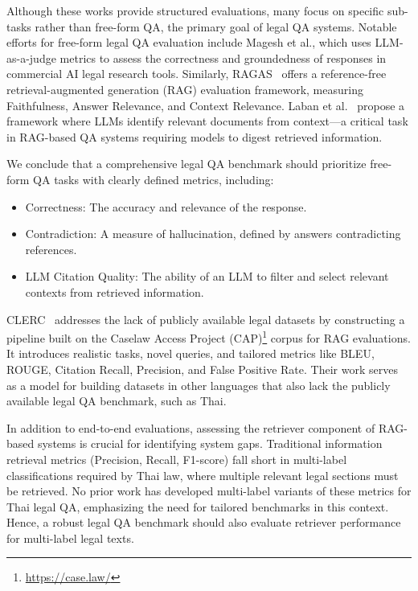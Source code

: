 Although these works provide structured evaluations, many focus on specific sub-tasks rather than free-form QA, the primary goal of legal QA systems. 
%
Notable efforts for free-form legal QA evaluation include Magesh et al.\cite{magesh2024hallucinationfreeassessingreliabilityleading}, which uses LLM-as-a-judge metrics to assess the correctness and groundedness of responses in commercial AI legal research tools. 
%
Similarly, RAGAS~\cite{es2023ragasautomatedevaluationretrieval} offers a reference-free retrieval-augmented generation (RAG) evaluation framework, measuring Faithfulness, Answer Relevance, and Context Relevance. 
%
Laban et al.~\cite{laban2024summaryhaystackchallengelongcontext} propose a framework where LLMs identify relevant documents from context—a critical task in RAG-based QA systems requiring models to digest retrieved information.

We conclude that a comprehensive legal QA benchmark should prioritize free-form QA tasks with clearly defined metrics, including:

\begin{itemize}
    \item{Correctness: The accuracy and relevance of the response.}
    \item{Contradiction: A measure of hallucination, defined by answers contradicting references.}
    \item{LLM Citation Quality: The ability of an LLM to filter and select relevant contexts from retrieved information.}
\end{itemize}

CLERC~\cite{clerc} addresses the lack of publicly available legal datasets by constructing a pipeline built on the Caselaw Access Project (CAP)\footnote{\url{https://case.law/}} corpus for RAG evaluations. 
%
It introduces realistic tasks, novel queries, and tailored metrics like BLEU, ROUGE, Citation Recall, Precision, and False Positive Rate.
%
Their work serves as a model for building datasets in other languages that also lack the publicly available legal QA benchmark, such as Thai.

In addition to end-to-end evaluations, assessing the retriever component of RAG-based systems is crucial for identifying system gaps. 
%
Traditional information retrieval metrics (Precision, Recall, F1-score) fall short in multi-label classifications required by Thai law, where multiple relevant legal sections must be retrieved. 
%
No prior work has developed multi-label variants of these metrics for Thai legal QA, emphasizing the need for tailored benchmarks in this context. 
%
Hence, a robust legal QA benchmark should also evaluate retriever performance for multi-label legal texts.


